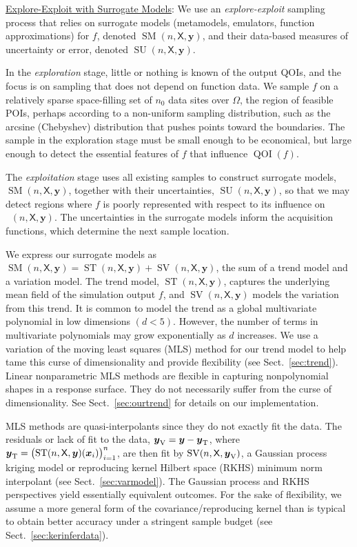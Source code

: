 \documentclass[11pt]{NSFamsart}
\newcommand{\Upara}[1]{\noindent\underline{\upshape #1}:}
\DeclareMathOperator{\QOI}{QOI} %
\DeclareMathOperator{\APP}{\widehat{\QOI}}
\DeclareMathOperator{\SURR}{SM} %
\DeclareMathOperator{\STREND}{ST} %
\DeclareMathOperator{\SVAR}{SV} %
\newcommand{\MLS}{\textrm{MLS}\xspace} %
\DeclareMathOperator{\SURRERR}{SU}
\newcommand{\TREND}{\textup{T}}
\newcommand{\VAR}{\textup{V}}
\newcommand{\mX}{\mathsf{X}}
\newcommand{\bx}{{\boldsymbol{x}}}
\newcommand{\by}{{\boldsymbol{y}}}
\begin{document}
\Upara{Explore-Exploit with Surrogate Models} We use an \emph{explore-exploit} sampling process that relies on surrogate models (metamodels, emulators, function approximations) for $f$, denoted $\SURR(n,\mX,\by)$, and their data-based measures of uncertainty or error, denoted $\SURRERR(n,\mX,\by)$. 

In the \emph{exploration} stage, little or nothing is known of the output QOIs, and the focus is on sampling that does not depend on function data. We sample $f$ on a relatively sparse space-filling set of $n_0$ data sites over $\Omega$, the region of feasible POIs, perhaps according to a non-uniform sampling distribution, such as the arcsine (Chebyshev) distribution that pushes points toward the boundaries. The sample in the exploration stage must be small enough to be economical, but large enough to detect the essential features of $f$ that influence $\QOI(f)$.

The \emph{exploitation} stage uses all existing samples to construct surrogate models, $\SURR(n,\mX,\by)$, together with their uncertainties, $\SURRERR(n,\mX,\by)$, so that we may detect regions where $f$ is poorly represented with respect to its influence on $\APP(n,\mX,\by)$. The uncertainties in the surrogate models inform the acquisition functions, which determine the next sample location.

We express our surrogate models as $\SURR(n,\mX,\by) = \STREND(n,\mX,\by) + \SVAR(n,\mX,\by)$, the sum of a trend model and a variation model. 
The trend model, $\STREND(n,\mX,\by)$, captures the underlying mean field of the simulation output $f$, and $\SVAR(n,\mX,\by)$ models the variation from this trend. 
It is common to model the trend as a global multivariate polynomial in low dimensions $(d<5)$. 
However, the number of terms in multivariate polynomials may grow exponentially as $d$ increases. We use 
a variation of the moving least squares (\MLS) method \cite{liumovingpartI1997, limovingpartII1996, salehi2013generalized, mederos2003moving} for our trend model to help tame this curse of dimensionality and provide flexibility (see Sect.\ \ref{sec:trend}). Linear nonparametric \MLS methods are flexible in capturing nonpolynomial shapes in a response surface. They do not necessarily suffer from the curse of dimensionality. 
See Sect.\ \ref{sec:ourtrend} for details on our implementation. 

\MLS methods are quasi-interpolants since they do not exactly fit the data. 
The residuals or lack of fit to the data, $\by_{\VAR} = \by - \by_{\TREND}$, where $\by_{\TREND} = \bigl( \STREND(n,\mX,\by)(\bx_i) \bigr)_{i=1}^n$, are then  fit by $\SVAR(n,\mX,\by_{\VAR})$, a Gaussian process kriging model or reproducing kernel Hilbert space (RKHS) minimum norm interpolant (see Sect.\ \ref{sec:varmodel}). The Gaussian process and RKHS perspectives yield essentially equivalent outcomes. For the sake of flexibility, we assume a more general form of the covariance/reproducing kernel than is typical to obtain better accuracy under a stringent sample budget (see Sect.\ \ref{sec:kerinferdata}). 
\end{document}
